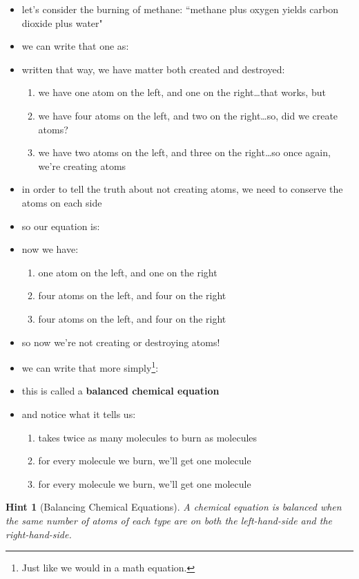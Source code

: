 \documentclass[11pt, oneside]{article}   	%
\newtheorem{hint}{Hint}
\begin{document}
\begin{itemize}
\item let's consider the burning of methane\cite[p. 117ff]{wile-chem-2}: ``methane plus oxygen yields carbon dioxide plus water"
\item we can write that one as:\\
\begin{center}
 \end{center}
\item written that way, we have matter both created and destroyed:
\begin{enumerate}
\item we have one  atom on the left, and one on the right\ldots that works, but
\item we have four  atoms on the left, and two on the right\ldots so, did we create atoms?
\item we have two  atoms on the left, and three on the right\ldots so once again, we're creating atoms
\end{enumerate}
\item in order to tell the truth about not creating atoms, we need to conserve the atoms on each side
\item so our equation is:\\  
\begin{center}
\end{center}
\item now we have:
\begin{enumerate}
\item one  atom on the left, and one on the right
\item four  atoms on the left, and four on the right
\item four  atoms on the left, and four on the right
\end{enumerate}
\item so now we're not creating or destroying atoms!
\item we can write that more simply\footnote{Just like we would in a math equation.}:\\
\begin{center}
 \end{center}
\item this is called a \textbf{balanced chemical equation}
\item and notice what it tells us:
\begin{enumerate}
\item {} takes twice as many  molecules to burn as  molecules 
\item for every  molecule we burn, we'll get one  molecule
\item for every  molecule we burn, we'll get one  molecule
\end{enumerate}
\end{itemize}

\begin{hint}[Balancing Chemical Equations]
A chemical equation is balanced when the same number of atoms of each type are on both the left-hand-side and the right-hand-side.
\end{hint}




\nocite{wile-chem-2}
{}

\end{document}
